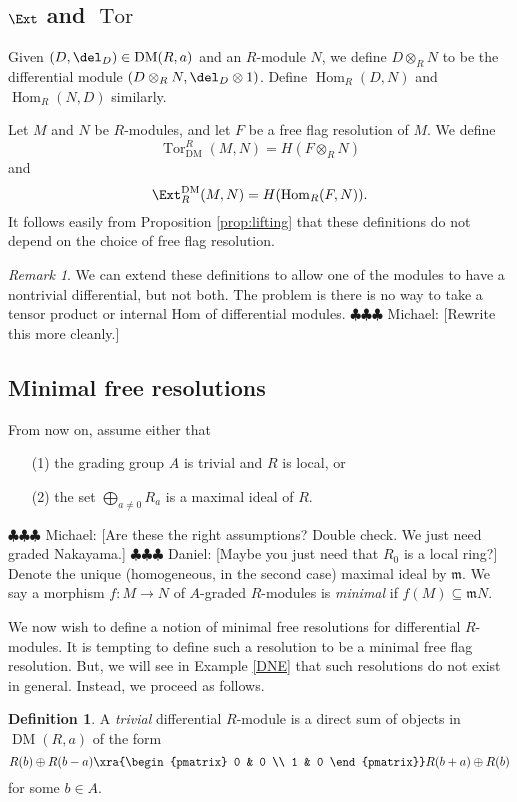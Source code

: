 \documentclass[12pt]{amsart}
\theoremstyle{definition}
\newtheorem{defn}[lemma]{Definition}
\theoremstyle{remark}
\newtheorem{rem}[lemma]{Remark}
\newcommand{\m}{\mathfrak m}
\newcommand{\Tor}{\operatorname{Tor}}
\newcommand{\Hom}{\operatorname{Hom}} %
\newcommand{\daniel}[1]{{\color{blue} \sf $\clubsuit\clubsuit\clubsuit$ Daniel: [#1]}}
\newcommand{\michael}[1]{{\color{red} \sf $\clubsuit\clubsuit\clubsuit$ Michael: [#1]}}
\def\DM{\operatorname{DM}}
\begin{document}
\subsection{$\Ext$ and $\Tor$}
Given $(D, \del_D) \in \DM(R, a)$ and an $R$-module $N$, we define $D \otimes_R N$ to be the differential module $(D \otimes_R N, \del_D \otimes 1)$. Define $\Hom_R(D, N)$ and $\Hom_R(N, D)$ similarly.

Let $M$ and $N$ be $R$-modules, and let $F$ be a free flag resolution of $M$. We define
$$
\Tor^R_{\DM}(M, N) = H(F \otimes_R N)
$$
and
$$
\Ext_R^{\DM}(M, N) = H(\Hom_R(F, N)).
$$
It follows easily from Proposition \ref{prop:lifting} that these definitions do not depend on the choice of free flag resolution. 

\begin{rem}
We can extend these definitions to allow one of the modules to have a nontrivial differential, but not both. The problem is there is no way to take a tensor product or internal Hom of differential modules. \michael{Rewrite this more cleanly.}
\end{rem}


\subsection{Minimal free resolutions}

From now on, assume either that
\begin{itemize}
\item[(1)] the grading group $A$ is trivial and $R$ is local, or
\item[(2)] the set $\bigoplus_{a \ne 0} R_a$ is a maximal ideal of $R$.
\end{itemize}
\michael{Are these the right assumptions? Double check. We just need graded Nakayama.}\daniel{Maybe you just need that $R_0$ is a local ring?}
Denote the unique (homogeneous, in the second case) maximal ideal by $\m$. We say a morphism $f : M \to N$ of $A$-graded $R$-modules is \emph{minimal} if $f(M) \subseteq \m N$.

We now wish to define a notion of minimal free resolutions for differential $R$-modules. It is tempting to define such a resolution to be a minimal free flag resolution. But, we will see in Example \ref{DNE} that such resolutions do not exist in general. Instead, we proceed as follows. 

\begin{defn}
A \emph{trivial} differential $R$-module is a direct sum of objects in $\DM(R, a)$ of the form
$$
R(b) \oplus R(b-a) \xra{\begin{pmatrix} 0 & 0 \\ 1 & 0 \end{pmatrix}} R(b+a) \oplus R(b)
$$
for some $b \in A $.
\end{defn}
\end{document}
